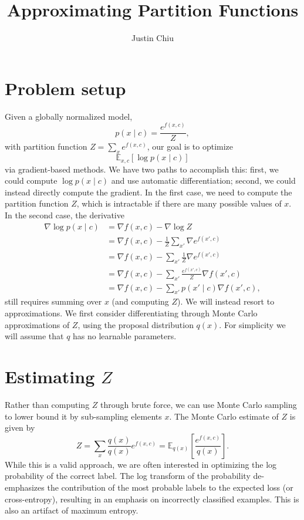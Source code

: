 \documentclass{article}
\title{Approximating Partition Functions}
\author{Justin Chiu}
\newcommand\Es[2]{\mathbb{E}_{#1}\left[#2\right]}
\begin{document}
\maketitle

\section{Problem setup}
Given a globally normalized model,
\begin{equation}
    p(x\mid c) = \frac{e^{f(x, c)}}{Z},
\end{equation}
with partition function $Z = \sum_{x}e^{f(x, c)}$,
our goal is to optimize 
\begin{equation}
\Es{x,c}{\log p(x \mid c)}
\end{equation}
via gradient-based methods.
We have two paths to accomplish this:
first, we could compute $\log p(x \mid c)$ and use automatic differentiation;
second, we could instead directly compute the gradient.
In the first case, we need to compute the partition function $Z$,
which is intractable if there are many possible values of $x$.
In the second case, the derivative 
\begin{equation}
\begin{aligned}
\nabla \log p(x \mid c) &= \nabla f(x,c) - \nabla \log Z\\
&= \nabla f(x,c) - \frac{1}{Z}\sum_{x'} \nabla e^{f(x', c)}\\
&= \nabla f(x,c) - \sum_{x'} \frac{1}{Z}\nabla e^{f(x', c)}\\
&= \nabla f(x,c) - \sum_{x'} \frac{e^{f(x',c)}}{Z}\nabla f(x', c)\\
&= \nabla f(x,c) - \sum_{x'}p(x' \mid c) \nabla f(x', c),
\end{aligned}
\end{equation}
still requires summing over $x$ (and computing $Z$).
We will instead resort to approximations.
We first consider differentiating through Monte Carlo approximations of $Z$, using the proposal distribution $q(x)$.
For simplicity we will assume that $q$ has no learnable parameters.

\section{Estimating $Z$}
Rather than computing $Z$ through brute force,
we can use Monte Carlo sampling to lower bound it by sub-sampling elements $x$.
The Monte Carlo estimate of $Z$ is given by
\begin{equation}
Z = \sum_x \frac{q(x)}{q(x)}e^{f(x, c)} = \Es{q(x)}{\frac{e^{f(x, c)}}{q(x)}}.
\end{equation}
While this is a valid approach, we are often interested in optimizing the log probability of the correct label.
The log transform of the probability de-emphasizes the contribution of 
the most probable labels to the expected loss (or cross-entropy), 
resulting in an emphasis on incorrectly classified examples.
This is also an artifact of maximum entropy.
\end{document}
